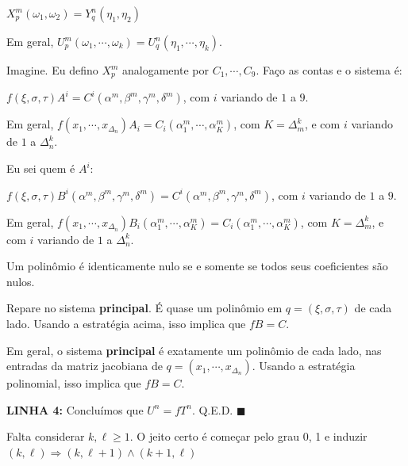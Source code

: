 \documentclass[10pt,a4paper]{article}
\begin{document}
		\vspace{3mm}

		$X_p^m(\omega_1, \omega_2) = Y_q^n(\eta_1, \eta_2)$

		Em geral, $U_p^m(\omega_1, \cdots, \omega_k) = U_q^n(\eta_1, \cdots, \eta_k)$.

		\vspace{3mm}

		Imagine. Eu defino $X_p^m$ analogamente por $C_1, \cdots, C_9$. Fa\c{c}o as contas e o sistema \'e:

		$f(\xi, \sigma, \tau) A^i = C^i(\alpha^m, \beta^m, \gamma^m, \delta^m)$, com $i$ variando de $1$ a $9$.

		\vspace{3mm}

		Em geral, $f(x_1, \cdots, x_{\Delta_n}) A_i = C_i (\alpha_1^m, \cdots, \alpha_K^m)$, com $K = \Delta_m^k$, e com $i$ variando de $1$ a $\Delta_n^k$.

		\vspace{3mm}

		Eu sei quem \'e $A^i$:

		$f(\xi, \sigma, \tau) B^i(\alpha^m, \beta^m, \gamma^m, \delta^m) = C^i(\alpha^m, \beta^m, \gamma^m, \delta^m)$, com $i$ variando de $1$ a $9$.

		\vspace{3mm}

		Em geral, $f(x_1, \cdots, x_{\Delta_n}) B_i(\alpha_1^m, \cdots, \alpha_K^m) = C_i(\alpha_1^m, \cdots, \alpha_K^m)$, com $K = \Delta_m^k$, e com $i$ variando de $1$ a $\Delta_n^k$.

		\vspace{3mm}

		Um polin\^omio \'e identicamente nulo se e somente se todos seus coeficientes s\~ao nulos.

		Repare no sistema \textbf{principal}. \'E quase um polin\^omio em $q = (\xi, \sigma, \tau)$ de cada lado. Usando a estrat\'egia acima, isso implica que $fB = C$.

		Em geral, o sistema \textbf{principal} \'e exatamente um polin\^omio de cada lado, nas entradas da matriz jacobiana de $q = (x_1, \cdots, x_{\Delta_n})$. Usando a estrat\'egia polinomial, isso implica que $fB = C$.

		\textbf{LINHA 4:} Conclu\'imos que $U^n = f T^n$. Q.E.D.$\,\,\blacksquare$

		Falta considerar $k, \ell \ge 1$. O jeito certo \'e come\c{c}ar pelo grau 0, 1 e induzir $(k, \ell) \Rightarrow (k, \ell + 1) \wedge (k + 1, \ell)$
\end{document}
